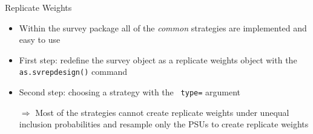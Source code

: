 \documentclass[11pt,german,hideothersubsections]{beamer}\usepackage[]{graphicx}\usepackage[]{color}
\newcommand{\R}[1]{{\tt \color{blue}  #1}}
\begin{document}
\begin{frame}[fragile]{Replicate Weights}
\footnotesize{
\begin{itemize}
\item Within the survey package all of the \emph{common} strategies are implemented and easy to use
\item First step: redefine the survey object as a replicate weights object with the \R{as.svrepdesign()} command
\item Second step: choosing a strategy with the \R{type=} argument
\pause\item[$\Rightarrow$] Most of the strategies cannot create replicate weights under unequal inclusion probabilities and resample only the PSUs to create replicate weights
\end{itemize}
}
\end{frame}
\end{document}
